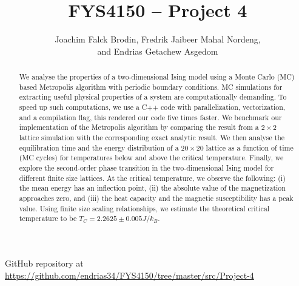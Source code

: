\documentclass[a4paper]{article}
\begin{document}
\title{FYS4150 -- Project 4}
\author{Joachim Falck Brodin,
        Fredrik Jaibeer Mahal Nordeng,\\ 
        and Endrias Getachew Asgedom}

\maketitle
\begin{abstract}
We analyse the properties of a two-dimensional Ising model using a Monte Carlo (MC) based Metropolis algorithm with periodic boundary conditions. MC simulations for extracting useful physical properties of a system are computationally demanding. To speed up such computations, we use a C++ code with parallelization, vectorization, and a compilation flag, this rendered our code five times faster. We benchmark our implementation of the Metropolis algorithm by comparing the result from a $2\times2$ lattice simulation with the corresponding exact analytic result. We then analyse the equilibration time and the energy distribution of a $20\times20$ lattice as a function of time (MC cycles) for temperatures below and above the critical temperature. Finally, we explore the second-order phase transition in the two-dimensional Ising model for different finite size lattices. At the critical temperature, we observe the following: (i) the mean energy has an inflection point, (ii) the absolute value of the magnetization approaches zero, and (iii) the heat capacity and the magnetic susceptibility has a peak value. Using finite size scaling relationships, we estimate the theoretical critical temperature to be $T_C=2.2625 \pm 0.005 J/k_B$.



\noindent




\end{abstract}

\newpage
\tableofcontents

\begin{center}
    GitHub repository at \url{https://github.com/endrias34/FYS4150/tree/master/src/Project-4}
\end{center}
\newcommand{\half}{\frac{1}{2}}
\newcommand{\dx}{{\Delta x}}
\newcommand{\bigO}{{\mathcal{O}}}

\newpage
\end{document}
